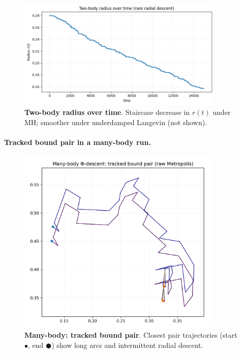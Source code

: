 \documentclass[aps,preprint,onecolumn,longbibliography,nofootinbib]{revtex4-2}
\numberwithin{equation}{section}        %
\begin{document}
\begin{figure}[H]
\centering
\includegraphics[width=0.88\textwidth]{figures/two_body_r_vs_t.png}
\caption{\textbf{Two-body radius over time}. Staircase decrease in $r(t)$ under MH; smoother under underdamped Langevin (not shown).}
\label{fig:tworadius}
\end{figure}

\paragraph*{Tracked bound pair in a many-body run.}
\begin{figure}[H]
\centering
\includegraphics[width=0.86\textwidth]{figures/orbit_many_body.png}
\caption{\textbf{Many-body: tracked bound pair}. Closest pair trajectories (start $\bullet$, end $\CIRCLE$) show long arcs and intermittent radial descent.}
\label{fig:manypair}
\end{figure}
\end{document}
